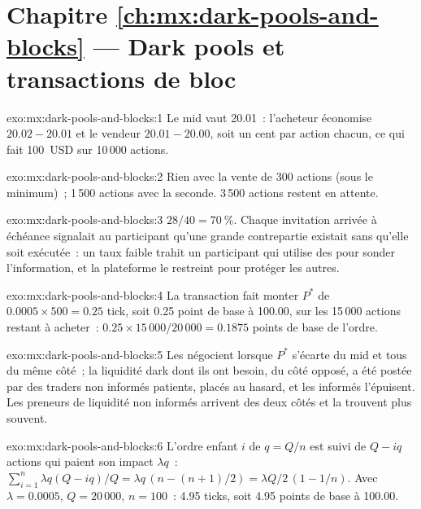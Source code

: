 \section*{Chapitre \ref{ch:mx:dark-pools-and-blocks} --- Dark pools et transactions de bloc}

\begin{solution}{exo:mx:dark-pools-and-blocks:1}
Le mid vaut 20.01~: l'acheteur économise $20.02-20.01$ et le vendeur $20.01-20.00$, soit un cent par action chacun, ce qui fait 100~USD sur 10\,000 actions.
\end{solution}

\begin{solution}{exo:mx:dark-pools-and-blocks:2}
Rien avec la vente de 300 actions (sous le minimum)~; 1\,500 actions avec la seconde. 3\,500 actions restent en attente.
\end{solution}

\begin{solution}{exo:mx:dark-pools-and-blocks:3}
$28/40=70~\%$. Chaque invitation arrivée à échéance signalait au participant qu'une grande contrepartie existait sans qu'elle soit exécutée~: un taux faible trahit un participant qui utilise
des  pour sonder l'information, et la plateforme le restreint pour protéger les autres.
\end{solution}

\begin{solution}{exo:mx:dark-pools-and-blocks:4}
La transaction fait monter $P^\ast$ de $0.0005\times500=0.25$ tick, soit 0.25 point de base à 100.00, sur les 15\,000 actions restant à acheter~: $0.25\times15\,000/20\,000=0.1875$
points de base de l'ordre.
\end{solution}

\begin{solution}{exo:mx:dark-pools-and-blocks:5}
Les  négocient lorsque $P^\ast$ s'écarte du mid et tous du même côté~; la liquidité dark dont ils ont besoin, du côté opposé, a été postée par
des traders non informés patients, placés au hasard, et les informés l'épuisent. Les preneurs de liquidité non informés arrivent des deux côtés et la trouvent plus souvent.
\end{solution}

\begin{solution}{exo:mx:dark-pools-and-blocks:6}
L'ordre enfant $i$ de $q=Q/n$ est suivi de $Q-iq$ actions qui paient son impact $\lambda q$~: $\sum_{i=1}^{n}\lambda q(Q-iq)/Q=\lambda q\,(n-(n+1)/2)=\lambda Q/2\,(1-1/n)$.
Avec $\lambda=0.0005$, $Q=20\,000$, $n=100$~: 4.95 ticks, soit 4.95 points de base à 100.00.
\end{solution}

